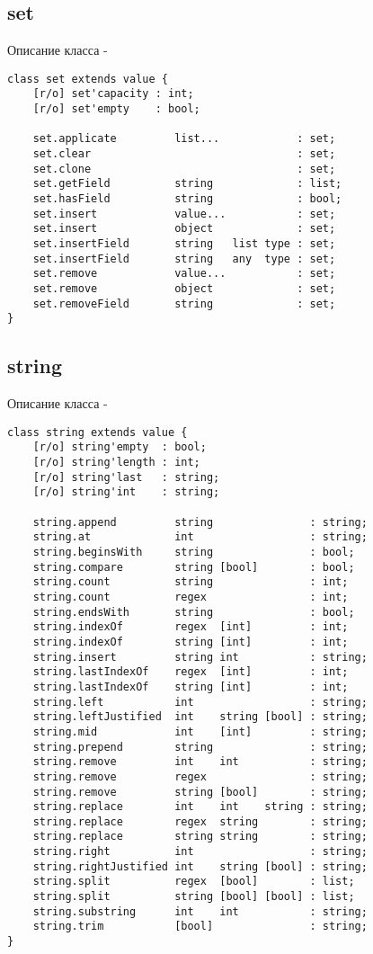 \subsection{{\color{lightblue} set}}

\noindent Описание класса \set -
\begin{verbatim}
class set extends value {
    [r/o] set'capacity : int;
    [r/o] set'empty    : bool;

    set.applicate         list...            : set;
    set.clear                                : set;
    set.clone                                : set;
    set.getField          string             : list;
    set.hasField          string             : bool;
    set.insert            value...           : set;
    set.insert            object             : set;
    set.insertField       string   list type : set;
    set.insertField       string   any  type : set;
    set.remove            value...           : set;
    set.remove            object             : set;
    set.removeField       string             : set;
}
\end{verbatim}

\subsection{{\color{lightblue} string}}

\noindent Описание класса \str -
\begin{verbatim}
class string extends value {
    [r/o] string'empty  : bool;
    [r/o] string'length : int;
    [r/o] string'last   : string;
    [r/o] string'int    : string;

    string.append         string               : string;
    string.at             int                  : string;
    string.beginsWith     string               : bool;
    string.compare        string [bool]        : bool;
    string.count          string               : int;
    string.count          regex                : int;
    string.endsWith       string               : bool;
    string.indexOf        regex  [int]         : int;
    string.indexOf        string [int]         : int;
    string.insert         string int           : string;
    string.lastIndexOf    regex  [int]         : int;
    string.lastIndexOf    string [int]         : int;
    string.left           int                  : string;
    string.leftJustified  int    string [bool] : string;
    string.mid            int    [int]         : string;
    string.prepend        string               : string;
    string.remove         int    int           : string;
    string.remove         regex                : string;
    string.remove         string [bool]        : string;
    string.replace        int    int    string : string;
    string.replace        regex  string        : string;
    string.replace        string string        : string;
    string.right          int                  : string;
    string.rightJustified int    string [bool] : string;
    string.split          regex  [bool]        : list;
    string.split          string [bool] [bool] : list;
    string.substring      int    int           : string;
    string.trim           [bool]               : string;
}
\end{verbatim}


